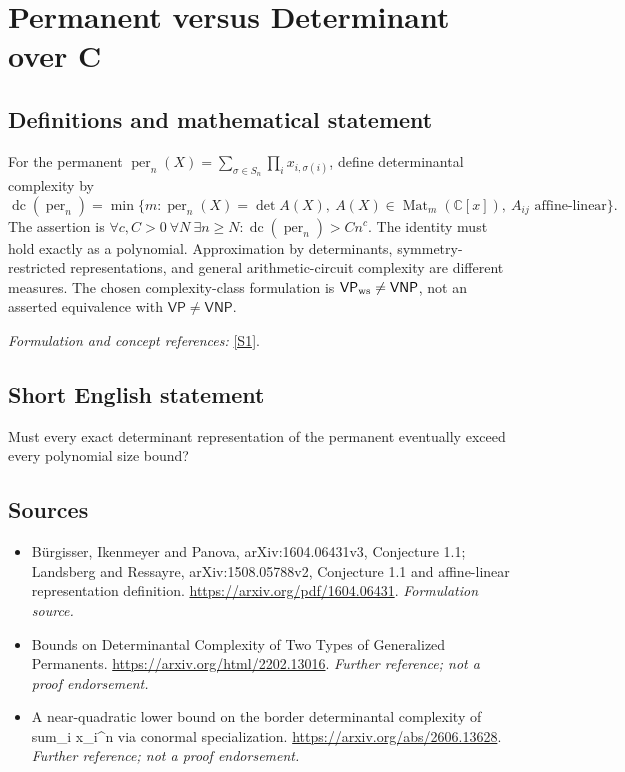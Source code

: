 \documentclass[11pt]{article}
\begin{document}
\section*{\texorpdfstring{Permanent versus Determinant over C}{Permanent versus Determinant over C}}\label{30006699}
\subsection{Definitions and mathematical statement}
For the permanent $\operatorname{per}_n(X)=\sum_{\sigma\in S_n}\prod_i x_{i,\sigma(i)}$, define determinantal complexity by
\[
 \operatorname{dc}(\operatorname{per}_n)=\min\{m:\operatorname{per}_n(X)=\det A(X),\
 A(X)\in\operatorname{Mat}_m({\mathbb{C}}[x]),\ A_{ij}\text{ affine-linear}\}.
\]
The assertion is $\forall c,C>0\ \forall N\ \exists n\ge N:\operatorname{dc}(\operatorname{per}_n)>Cn^c$. The identity must hold exactly as a polynomial. Approximation by determinants, symmetry-restricted representations, and general arithmetic-circuit complexity are different measures. The chosen complexity-class formulation is $\mathsf{VP}_{\rm ws}\ne\mathsf{VNP}$, not an asserted equivalence with $\mathsf{VP}\ne\mathsf{VNP}$.
\par\smallskip\textit{Formulation and concept references:} \href{https://arxiv.org/pdf/1604.06431}{[S1]}.

\subsection{Short English statement}
Must every exact determinant representation of the permanent eventually exceed every polynomial size bound?
\subsection{Sources}
\begin{itemize}
\item[S1]Bürgisser, Ikenmeyer and Panova, arXiv:1604.06431v3, Conjecture 1.1; Landsberg and Ressayre, arXiv:1508.05788v2, Conjecture 1.1 and affine-linear representation definition.
\url{https://arxiv.org/pdf/1604.06431}.
\textit{Formulation source.}
\item[S2]Bounds on Determinantal Complexity of Two Types of Generalized Permanents.
\url{https://arxiv.org/html/2202.13016}.
\textit{Further reference; not a proof endorsement.}
\item[S3]A near-quadratic lower bound on the border determinantal complexity of sum\_i x\_i\textasciicircum{}n via conormal specialization.
\url{https://arxiv.org/abs/2606.13628}.
\textit{Further reference; not a proof endorsement.}
\end{itemize}
\end{document}
